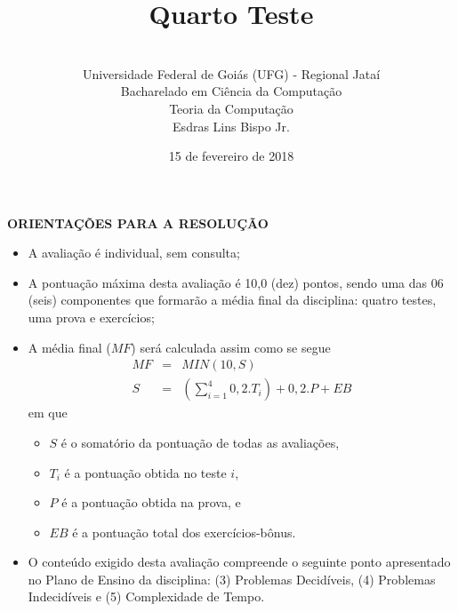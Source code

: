 \documentclass[12pt,a4paper,oneside]{article}
\author{\\Universidade Federal de Goiás (UFG) - Regional  Jataí\\Bacharelado em Ciência da Computação \\Teoria da Computação \\Esdras Lins Bispo Jr.}
\date{15 de fevereiro de 2018}
\title{\sc \huge Quarto Teste}
\begin{document}
\maketitle

{\bf ORIENTAÇÕES PARA A RESOLUÇÃO}

\small
 
\begin{itemize}
	\item A avaliação é individual, sem consulta;
	\item A pontuação máxima desta avaliação é 10,0 (dez) pontos, sendo uma das 06 (seis) componentes que formarão a média final da disciplina: quatro testes, uma prova e exercícios;
	\item A média final ($MF$) será calculada assim como se segue
	\begin{eqnarray}
		MF & = & MIN(10, S) \nonumber \\
		S & = & (\sum_{i=1}^{4} 0,2.T_i ) + 0,2.P  + EB\nonumber
	\end{eqnarray}
	em que 
	\begin{itemize}
		\item $S$ é o somatório da pontuação de todas as avaliações,
		\item $T_i$ é a pontuação obtida no teste $i$,
		\item $P$ é a pontuação obtida na prova, e
		\item $EB$ é a pontuação total dos exercícios-bônus.
	\end{itemize}
	\item O conteúdo exigido desta avaliação compreende o seguinte ponto apresentado no Plano de Ensino da disciplina: (3) Problemas Decidíveis, (4) Problemas Indecidíveis e (5) Complexidade de Tempo.
\end{itemize}

\begin{center}
\end{center}

\newpage
\end{document}
